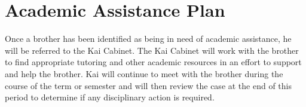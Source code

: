 \chapter{Academic Assistance Plan}
\label{cha:academic-assistance-plan}

Once a brother has been identified as being in need of academic assistance, he
will be referred to the Kai Cabinet.
The Kai Cabinet will work with the brother to find appropriate tutoring and
other academic resources in an effort to support and help the brother.
Kai will continue to meet with the brother during the course of the term or
semester and will then review the case at the end of this period to determine
if any disciplinary action is required.

